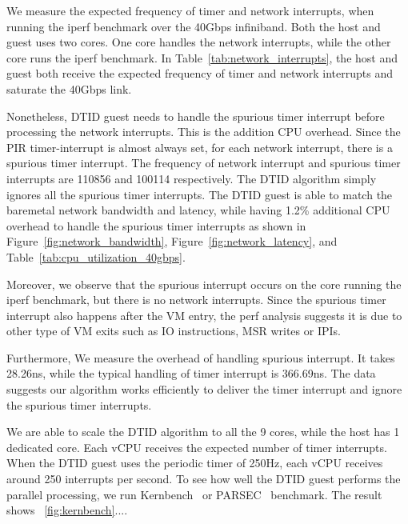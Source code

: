 We measure the expected frequency of timer and network
interrupts, when running the iperf benchmark over the 40Gbps
infiniband. Both the host and guest uses two cores. One core
handles the network interrupts, while the other core runs the
iperf benchmark. In Table~\ref{tab:network_interrupts}, the
host and guest both receive the expected frequency of timer
and network interrupts and saturate the 40Gbps link.

Nonetheless, DTID guest needs to handle the spurious timer
interrupt before processing the network interrupts. This is
the addition CPU overhead. Since the PIR timer-interrupt is
almost always set, for each network interrupt, there is a
spurious timer interrupt. The frequency of network interrupt
and spurious timer interrupts are 110856 and 100114
respectively. The DTID algorithm simply ignores all the
spurious timer interrupts. The DTID guest is able to match the
baremetal network bandwidth and latency, while having 1.2\%
additional CPU overhead to handle the spurious timer
interrupts as shown in Figure~\ref{fig:network_bandwidth},
Figure~\ref{fig:network_latency}, and
Table~\ref{tab:cpu_utilization_40gbps}.

Moreover, we observe that the spurious interrupt occurs on the
core running the iperf benchmark, but there is no network
interrupts. Since the spurious timer interrupt also happens
after the VM entry, the perf analysis suggests it is due to
other type of VM exits such as IO instructions, MSR writes or
IPIs.

Furthermore, We measure the overhead of handling spurious
interrupt. It takes 28.26ns, while the typical handling of
timer interrupt is 366.69ns. The data suggests our algorithm
works efficiently to deliver the timer interrupt and ignore
the spurious timer interrupts.

We are able to scale the DTID algorithm to all the 9 cores,
while the host has 1 dedicated core. Each vCPU receives the
expected number of timer interrupts. When the DTID guest uses
the periodic timer of 250Hz, each vCPU receives around 250
interrupts per second. To see how well the DTID guest performs
the parallel processing, we run Kernbench~\cite{kernbench} or
PARSEC~\cite{bienia:2008} benchmark. The result shows
~\ref{fig:kernbench}....
